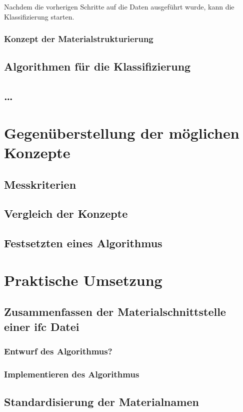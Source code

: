 Nachdem die vorherigen Schritte auf die Daten ausgeführt wurde, kann die Klassifizierung starten.

\subsection{Konzept der Materialstrukturierung}
\section{Algorithmen für die Klassifizierung}
\section{\dots}


\chapter{Gegenüberstellung der möglichen Konzepte}
\label{c:comparison}
\section{Messkriterien}
\section{Vergleich der Konzepte}
\section{Festsetzten eines Algorithmus}


\chapter{Praktische Umsetzung}
\label{c:implementation}
\section{Zusammenfassen der Materialschnittstelle einer \ac{ifc} Datei}
\subsection{Entwurf des Algorithmus?}
\subsection{Implementieren des Algorithmus}

\section{Standardisierung der Materialnamen}
